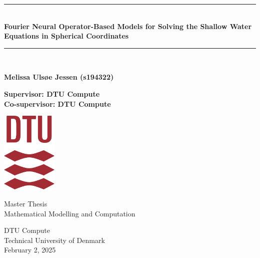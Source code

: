 \begin{titlepage}
\newcommand{\HRule}{\rule{\linewidth}{0.5mm}} 


    \begin{center}
        
        \HRule\\[0.4cm]
        
        {\huge\bfseries Fourier Neural Operator-Based Models for Solving the Shallow Water Equations in Spherical Coordinates}\\[0.4cm]
        


        \HRule\\[1.5cm]
 


        \vspace{1.1cm}
 
        \textbf{Melissa Ulsøe Jessen (s194322)}
        
        \vspace{1.1cm}
 
        \textbf{Supervisor:  DTU Compute}\\
        \textbf{Co-supervisor:  DTU Compute}

             
        \vspace{1.5cm}
        \includegraphics[width=0.2\textwidth]{figs/DTU.png}
             
         \vspace{1cm}
             
         Master Thesis\\
         Mathematical Modelling and Computation\\   
         
         \vfill
             
        DTU Compute\\
        Technical University of Denmark\\
        February 2, 2025
             
    \end{center}
 \end{titlepage}

